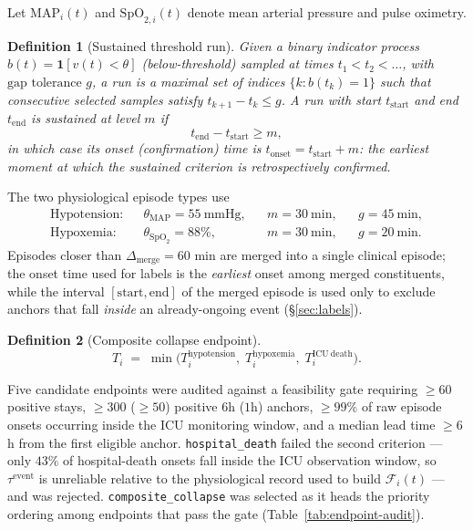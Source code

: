 \documentclass[11pt]{article}
\newtheorem{definition}{Definition}[section]
\newcommand{\F}{\mathcal{F}}
\newcommand{\1}[1]{\mathbf{1}\!\left[#1\right]}
\begin{document}
Let $\mathrm{MAP}_i(t)$ and $\mathrm{SpO}_{2,i}(t)$ denote mean arterial pressure and pulse oximetry.

\begin{definition}[Sustained threshold run]
Given a binary indicator process $b(t)=\1{v(t) < \theta}$ (below-threshold) sampled at times $t_1 < t_2 < \dots$, with $\text{gap tolerance } g$, a \emph{run} is a maximal set of indices $\{k : b(t_k)=1\}$ such that consecutive selected samples satisfy $t_{k+1} - t_k \le g$. A run with start $t_{\mathrm{start}}$ and end $t_{\mathrm{end}}$ is \emph{sustained} at level $m$ if
\[
t_{\mathrm{end}} - t_{\mathrm{start}} \ge m,
\]
in which case its \emph{onset} (confirmation) time is $t_{\mathrm{onset}} = t_{\mathrm{start}} + m$: the earliest moment at which the sustained criterion is retrospectively confirmed.
\end{definition}
The two physiological episode types use
\begin{align}
\text{Hypotension:} && \theta_{\mathrm{MAP}} = 55\ \text{mmHg}, && m = 30\ \text{min}, && g = 45\ \text{min}, \\
\text{Hypoxemia:} && \theta_{\mathrm{SpO}_2} = 88\%, && m = 30\ \text{min}, && g = 20\ \text{min}.
\end{align}
Episodes closer than $\Delta_{\mathrm{merge}}=60$ min are merged into a single clinical episode; the onset time used for labels is the \emph{earliest} onset among merged constituents, while the interval $[\mathrm{start},\mathrm{end}]$ of the merged episode is used only to exclude anchors that fall \emph{inside} an already-ongoing event (\S\ref{sec:labels}).

\begin{definition}[Composite collapse endpoint]
\begin{equation}
T_i \;=\; \min\big(T_i^{\mathrm{hypotension}},\; T_i^{\mathrm{hypoxemia}},\; T_i^{\mathrm{ICU\ death}}\big).
\end{equation}
\end{definition}

Five candidate endpoints were audited against a feasibility gate requiring $\ge 60$ positive stays, $\ge 300$ ($\ge 50$) positive $6$h ($1$h) anchors, $\ge 99\%$ of raw episode onsets occurring inside the ICU monitoring window, and a median lead time $\ge 6$h from the first eligible anchor. \texttt{hospital\_death} failed the second criterion --- only $43\%$ of hospital-death onsets fall inside the ICU observation window, so $\tau^{\text{event}}$ is unreliable relative to the physiological record used to build $\F_i(t)$ --- and was rejected. \texttt{composite\_collapse} was selected as it heads the priority ordering among endpoints that pass the gate (Table~\ref{tab:endpoint-audit}).
\end{document}
